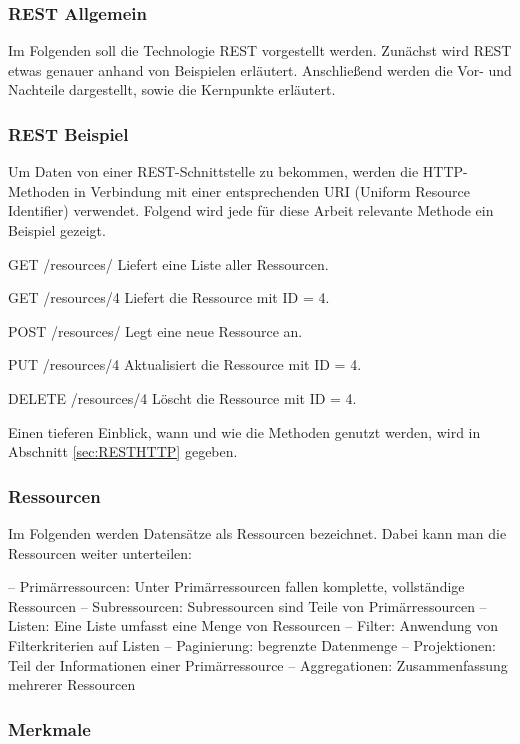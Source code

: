 
\subsubsection{\ac{REST} Allgemein}
\label{sec:RESTAllgemein}


Im Folgenden soll die Technologie REST vorgestellt werden.
Zunächst wird REST etwas genauer anhand von Beispielen erläutert.
Anschließend werden die Vor- und Nachteile dargestellt, sowie die Kernpunkte erläutert.

\subsubsection{\ac{REST} Beispiel}
\label{sec:RESTBeispiel}

Um Daten von einer REST-Schnittstelle zu bekommen, werden die HTTP-Methoden in Verbindung mit einer entsprechenden URI (Uniform Resource Identifier) verwendet. Folgend wird jede für diese Arbeit relevante Methode ein Beispiel gezeigt.

GET /resources/
Liefert eine Liste aller Ressourcen.

GET /resources/4
Liefert die Ressource mit ID = 4.

POST /resources/
Legt eine neue Ressource an.

PUT /resources/4
Aktualisiert die Ressource mit ID = 4.

DELETE /resources/4
Löscht die Ressource mit ID = 4.

Einen tieferen Einblick, wann und wie die Methoden genutzt werden, wird in Abschnitt \ref{sec:RESTHTTP} gegeben.

\subsubsection{Ressourcen}
\label{sec:RESTRessourcen}

Im Folgenden werden Datensätze als Ressourcen bezeichnet. Dabei kann man die Ressourcen weiter unterteilen:

–	Primärressourcen: Unter Primärressourcen fallen komplette, vollständige Ressourcen
–	Subressourcen: Subressourcen sind Teile von Primärressourcen
–	Listen: Eine Liste umfasst eine Menge von Ressourcen
–	Filter: Anwendung von Filterkriterien auf Listen
–	Paginierung: begrenzte Datenmenge
–	Projektionen: Teil der Informationen einer Primärressource
–	Aggregationen: Zusammenfassung mehrerer Ressourcen

\subsubsection{Merkmale}
\label{sec:RESTMerkmale}

